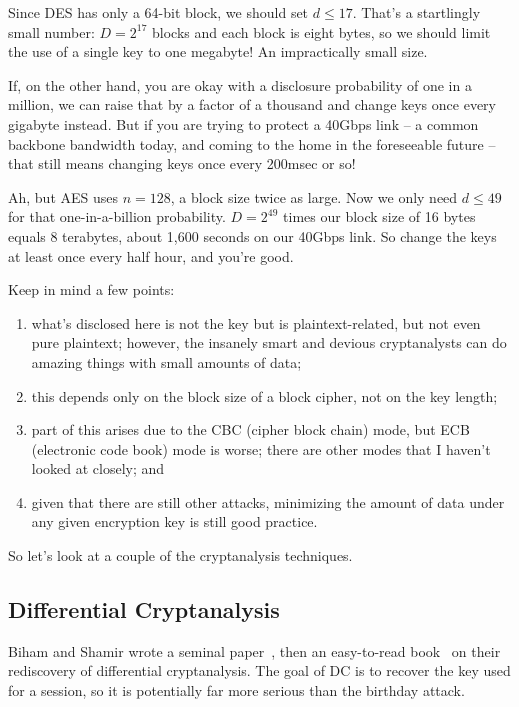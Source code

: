 Since DES has only a 64-bit block, we should set $d \le 17$.  That's a
startlingly small number: $D = 2^{17}$ blocks and each block is eight
bytes, so we should limit the use of a single key to one megabyte!
An impractically small size.

If, on the other hand, you are okay with a disclosure probability of
one in a million, we can raise that by a factor of a thousand and
change keys once every gigabyte instead.  But if you are trying to
protect a 40Gbps link -- a common backbone bandwidth today, and coming
to the home in the foreseeable future -- that still means changing
keys once every 200msec or so!

Ah, but AES uses $n = 128$, a block size twice as large.  Now we only
need $d \le 49$ for that one-in-a-billion probability.  $D = 2^{49}$
times our block size of 16 bytes equals 8 terabytes, about 1,600
seconds on our 40Gbps link.  So change the keys at least once every
half hour, and you're good. 

Keep in mind a few points:
\begin{enumerate}
\item what's disclosed here is not the key but is plaintext-related, but
   not even pure plaintext; however, the insanely smart and devious
   cryptanalysts can do amazing things with small amounts of data;
\item this depends only on the block size of a block cipher, not on the
   key length;
\item part of this arises due to the CBC (cipher block chain) mode, but
   ECB (electronic code book) mode is worse; there are other modes
   that I haven't looked at closely; and
\item given that there are still other attacks, minimizing the amount of
   data under any given encryption key is still good practice.
\end{enumerate}

So let's look at a couple of the cryptanalysis techniques.

\subsection{Differential Cryptanalysis}

Biham and Shamir wrote a seminal paper~\cite{biham1991differential},
then an easy-to-read book~\cite{biham1993differential-book} on their
rediscovery of differential cryptanalysis.  The goal of DC is to
recover the key used for a session, so it is potentially far more
serious than the birthday attack.


